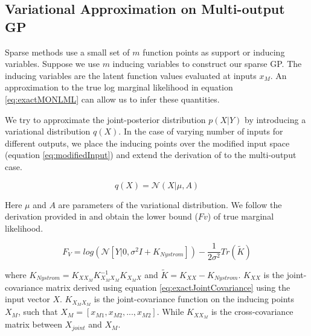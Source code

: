 \subsection{Variational Approximation on Multi-output GP}\label{sec:varMOGP}
Sparse methods use a small set of \(m\) function points as support or inducing variables. Suppose we use \(m\) inducing variables to construct our sparse GP. The inducing variables are the latent function values evaluated at inputs \(x_{M}\). An approximation to the true log marginal likelihood in equation \ref{eq:exactMONLML} can allow us to infer these quantities.

We try to approximate the joint-posterior distribution \(p(X| Y)\) by introducing a variational distribution \(q(X)\). In the case of varying number of inputs for different outputs, we place the inducing points over the modified input space (equation \ref{eq:modifiedInput}) and extend the derivation of \cite{Titsias09variationallearning} to the multi-output case. 

\begin{equation}\label{eq:multiVariationalQ}
 q(X) = \mathcal{N}(X|  \mu, A)
\end{equation}
 
Here \(\mu\) and \(A\) are parameters of the variational distribution. We follow the derivation provided in \cite{Titsias09variationallearning} and obtain the lower bound ($Fv$) of true marginal likelihood.

\begin{equation}\label{eq:lowerBoundMultiVarNLML}
F_{V} = log(\mathcal{N}[Y| 0, \sigma ^{2}I + K_{Nystrom}]) - \frac{1}{2\sigma ^{2}}Tr(\tilde{K})
\end{equation}

where \(K_{Nystrom} = K_{XX_{M}}K_{X_{M}X_{M}}^{-1}K_{X_{M}X}\) and \(\tilde{K} = K_{XX} - K_{Nystrom}\). \(K_{XX}\) is the joint-covariance matrix derived using equation \ref{eq:exactJointCovariance} using the input vector \(X\). \(K_{X_{M}X_{M}}\) is the joint-covariance function on the inducing points \(X_{M}\), such that \(X_{M} = [x_{M1}, x_{M2}, ..., x_{M2}]\). While \(K_{XX_{M}}\) is the cross-covariance matrix between \(X_{joint}\) and \(X_{M}\). 

